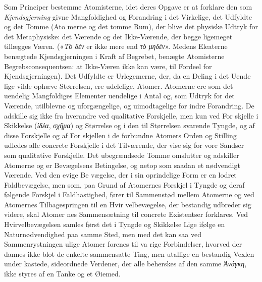 \documentclass[12pt,a4paper]{book}
\newcommand{\gk}[1]{\textit{#1}}
\begin{document}
Som Principer bestemme Atomisterne, idet deres Opgave er
at forklare den som \emph{Kjendsgjerning} givne Mangfoldighed og
Forandring i det Virkelige, det Udfyldte og det Tomme (Ato\-%
merne og det tomme Rum), der blive det physiske Udtryk for
det Metaphysiske: det Værende og det Ikke-Værende, der
begge ligemeget tillægges Væren. («\gk{Τὸ δὲν} er ikke mere end
\gk{τὸ μηδέν}». Medens Eleaterne benægtede Kjendsgjerningen i
Kraft af Begrebet, benægte Atomisterne Begrebsconsequentsen:
at Ikke-Væren ikke kan være, til Fordeel for Kjendsgjerningen).
Det Udfyldte er Urlegemerne, der, da en Deling i det Uende\-%
lige vilde ophæve Størrelsen, ere udelelige, Atomer. Atomerne
ere som det uendelig Mangfoldiges Elementer uendelige i Antal
og, som Udtryk for det Værende, utilblevne og uforgængelige,
og uimodtagelige for indre Forandring. De adskille sig ikke
fra hverandre ved qualitative Forskjelle, men kun ved For\-%
skjelle i Skikkelse (\gk{ἰδέα}, \gk{σχῆμα}) og Størrelse og i den til
Størrelsen svarende Tyngde, og af disse Forskjelle og af For\-%
skjellen i de forbundne Atomers Orden og Stilling udledes alle
concrete Forskjelle i det Tilværende, der vise sig for vore
Sandser som qualitative Forskjelle. Det ubegrændsede Tomme
omslutter og adskiller Atomerne og er Bevægelsens Betingelse,
og netop som saadan et nødvendigt Værende. Ved den evige Be\-%
vægelse, der i sin oprindelige Form er en lodret Faldbevægelse,
men som, paa Grund af Atomernes Forskjel i Tyngde og deraf
følgende Forskjel i Faldhastighed, fører til Sammenstød
mellem Atomerne og ved Atomernes Tilbagespringen til en Hvir\-%
velbevægelse, der bestandig udbreder sig videre, skal Atomer\-%
nes Sammensætning til concrete Existentser forklares. Ved
Hvirvelbevægelsen samles først det i Tyngde og Skikkelse Lige
ifølge en Naturnødvendighed paa samme Sted, men med det
kan saa ved Sammenrystningen ulige Atomer forenes til va\-%
rige Forbindelser, hvorved der dannes ikke blot de enkelte
sammensatte Ting, men utallige en bestandig Vexlen under\-%
%
%
%
kastede, sideordnede Verdener, der alle beherskes af den samme
\gk{Ἀνάγκη}, ikke styres af en Tanke og et Øiemed.
\end{document}
